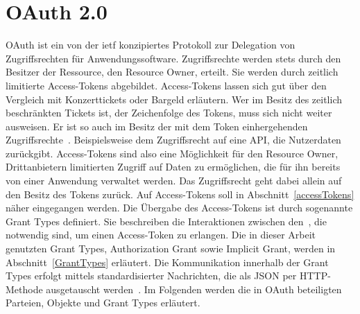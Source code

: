 \chapter{OAuth 2.0} \gls{OAuth} ist ein von der \gls{ietf} konzipiertes
Protokoll zur Delegation von Zugriffsrechten für Anwendungssoftware.
Zugriffsrechte werden stets durch den Besitzer der Ressource, den Resource
Owner, erteilt. Sie werden durch zeitlich limitierte Access-Tokens abgebildet.
Access-Tokens lassen sich gut über den Vergleich mit Konzerttickets oder Bargeld
erläutern. Wer im Besitz des zeitlich beschränkten Tickets ist, der Zeichenfolge
des Tokens, muss sich nicht weiter ausweisen. Er ist so auch im Besitz der mit
dem Token einhergehenden Zugriffsrechte~.
Beispielsweise dem Zugriffsrecht auf eine API, die Nutzerdaten zurückgibt.
Access-Tokens sind also eine Möglichkeit für den Resource Owner, Drittanbietern
limitierten Zugriff auf Daten zu ermöglichen, die für ihn bereits von einer
Anwendung verwaltet werden. Das Zugriffsrecht geht dabei allein auf den Besitz
des Tokens zurück. Auf Access-Tokens soll in Abschnitt~\ref{accessTokens} näher
eingegangen werden. Die Übergabe des Access-Tokens ist durch sogenannte
\glspl{Grant Type} definiert. Sie beschreiben die Interaktionen zwischen
den~, die notwendig sind, um einen Access-Token zu erlangen.
Die in dieser Arbeit genutzten \glspl{Grant Type}, Authorization Grant sowie
Implicit Grant, werden in Abschnitt~\ref{GrantTypes} erläutert. Die
Kommunikation innerhalb der \glspl{Grant Type} erfolgt mittels standardisierter
Nachrichten, die als JSON per HTTP-Methode ausgetauscht
werden~. Im Folgenden werden die in \gls{OAuth}
beteiligten Parteien, Objekte und \glspl{Grant Type} erläutert.





